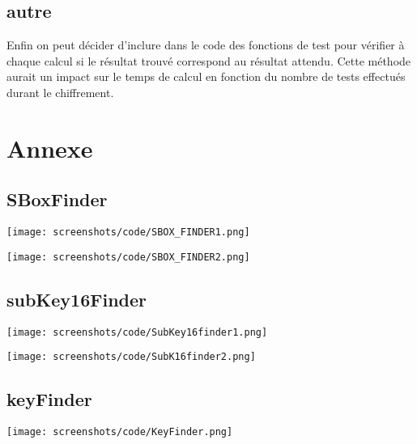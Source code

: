 \documentclass[a4paper,11pt]{article}
\begin{document}
		\subsection{autre}
			Enfin on peut décider d'inclure dans le code des fonctions de test pour vérifier à chaque calcul si le résultat trouvé correspond au résultat attendu. Cette méthode aurait un impact sur le temps de calcul en fonction du nombre de tests effectués durant le chiffrement.
	\section{Annexe}
		\subsection{SBoxFinder}
			\begin{center}\texttt{[image: screenshots/code/SBOX\_FINDER1.png]}\end{center} 
			\begin{center}\texttt{[image: screenshots/code/SBOX\_FINDER2.png]}\end{center} 
		\subsection{subKey16Finder}
			\begin{center}\texttt{[image: screenshots/code/SubKey16finder1.png]}\end{center} 
			\begin{center}\texttt{[image: screenshots/code/SubK16finder2.png]}\end{center}
		\subsection{keyFinder}
			\begin{center}\texttt{[image: screenshots/code/KeyFinder.png]}\end{center} 
\end{document}
